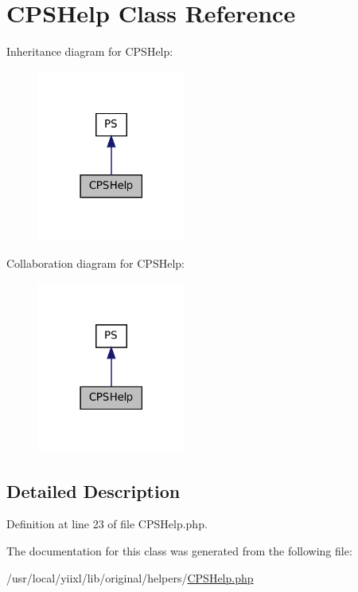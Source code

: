\hypertarget{classCPSHelp}{
\section{CPSHelp Class Reference}
\label{classCPSHelp}
}


Inheritance diagram for CPSHelp:\nopagebreak
\begin{figure}[H]
\begin{center}
\leavevmode
\includegraphics[width=138pt]{classCPSHelp__inherit__graph}
\end{center}
\end{figure}


Collaboration diagram for CPSHelp:\nopagebreak
\begin{figure}[H]
\begin{center}
\leavevmode
\includegraphics[width=138pt]{classCPSHelp__coll__graph}
\end{center}
\end{figure}


\subsection{Detailed Description}


Definition at line 23 of file CPSHelp.php.



The documentation for this class was generated from the following file:\begin{DoxyCompactItemize}
\item 
/usr/local/yiixl/lib/original/helpers/\hyperlink{CPSHelp_8php}{CPSHelp.php}\end{DoxyCompactItemize}
